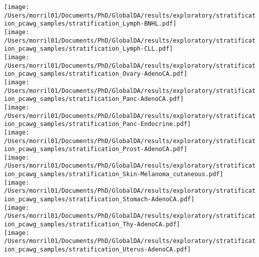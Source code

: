 \documentclass{article}
\begin{document}
\texttt{[image: /Users/morril01/Documents/PhD/GlobalDA/results/exploratory/stratification\_pcawg\_samples/stratification\_Lymph-BNHL.pdf]}\\
\texttt{[image: /Users/morril01/Documents/PhD/GlobalDA/results/exploratory/stratification\_pcawg\_samples/stratification\_Lymph-CLL.pdf]}\\
\texttt{[image: /Users/morril01/Documents/PhD/GlobalDA/results/exploratory/stratification\_pcawg\_samples/stratification\_Ovary-AdenoCA.pdf]}\\
\texttt{[image: /Users/morril01/Documents/PhD/GlobalDA/results/exploratory/stratification\_pcawg\_samples/stratification\_Panc-AdenoCA.pdf]}\\
\texttt{[image: /Users/morril01/Documents/PhD/GlobalDA/results/exploratory/stratification\_pcawg\_samples/stratification\_Panc-Endocrine.pdf]}\\
\texttt{[image: /Users/morril01/Documents/PhD/GlobalDA/results/exploratory/stratification\_pcawg\_samples/stratification\_Prost-AdenoCA.pdf]}\\
\texttt{[image: /Users/morril01/Documents/PhD/GlobalDA/results/exploratory/stratification\_pcawg\_samples/stratification\_Skin-Melanoma\_cutaneous.pdf]}\\
\texttt{[image: /Users/morril01/Documents/PhD/GlobalDA/results/exploratory/stratification\_pcawg\_samples/stratification\_Stomach-AdenoCA.pdf]}\\
\texttt{[image: /Users/morril01/Documents/PhD/GlobalDA/results/exploratory/stratification\_pcawg\_samples/stratification\_Thy-AdenoCA.pdf]}\\
\texttt{[image: /Users/morril01/Documents/PhD/GlobalDA/results/exploratory/stratification\_pcawg\_samples/stratification\_Uterus-AdenoCA.pdf]}
\end{document}
